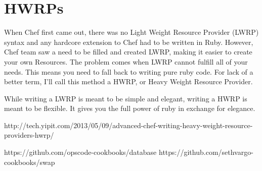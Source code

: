 \section{HWRPs}

When Chef first came out, there was no Light Weight Resource Provider (LWRP) syntax and any hardcore extension to Chef had to be written in Ruby. However, Chef team saw a need to be filled and created LWRP, making it easier to create your own Resources. The problem comes when LWRP cannot fulfill all of your needs. This means you need to fall back to writing pure ruby code. For lack of a better term, I'll call this method a HWRP, or Heavy Weight Resource Provider.

While writing a LWRP is meant to be simple and elegant, writing a HWRP is meant to be flexible. It gives you the full power of ruby in exchange for elegance.

http://tech.yipit.com/2013/05/09/advanced-chef-writing-heavy-weight-resource-providers-hwrp/

https://github.com/opscode-cookbooks/database
https://github.com/sethvargo-cookbooks/swap